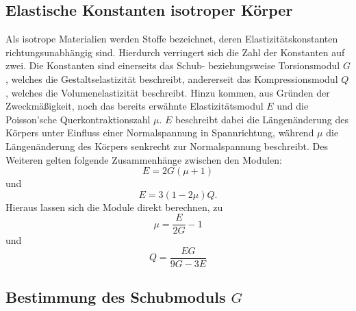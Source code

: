     \subsection{Elastische Konstanten isotroper Körper}
    \label{sec:konstanten}
    Als isotrope Materialien werden Stoffe bezeichnet, deren Elastizitätskonstanten richtungsunabhängig sind. Hierdurch verringert
    sich die Zahl der Konstanten auf zwei.
    Die Konstanten sind einerseits das Schub- beziehungsweise Torsionsmodul $G$, welches die Gestaltselastizität beschreibt, 
    andererseit das Kompressionsmodul $Q$, welches die Volumenelastizität beschreibt. Hinzu kommen, aus Gründen der Zweckmäßigkeit,
    noch das bereits erwähnte Elastizitätsmodul $E$ und die Poisson'sche Querkontraktionszahl $\mu$.
    $E$ beschreibt dabei die Längenänderung des Körpers unter Einfluss einer Normalspannung in Spannrichtung, während $\mu$ 
    die Längenänderung des Körpers senkrecht zur Normalspannung beschreibt. 
    Des Weiteren gelten folgende Zusammenhänge zwischen den Modulen:
    \begin{equation}
    \label{eqn:Zusammenhang1}
    E = 2 G (\mu + 1)
    \end{equation}
    und
    \begin{equation}
    \label{eqn:Zusammenhang2}
    E = 3 (1- 2 \mu) Q.
    \end{equation}
    Hieraus lassen sich die Module direkt berechnen, zu
    \begin{equation}
    \label{eqn:mubestimmen}
    \mu = \frac{E}{2G} -1
    \end{equation}
    und 
    \begin{equation}
    \label{eqn:Qbestimmen}
    Q = \frac{EG}{9G - 3E}
    \end{equation}
\subsection{Bestimmung des Schubmoduls $G$}
    
